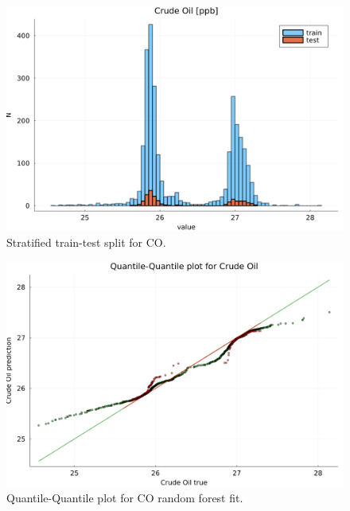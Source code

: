 \documentclass[remotesensing,article,submit,pdftex,moreauthors]{Definitions/mdpi}
\begin{document}
\begin{figure}[H]
\includegraphics[width=10.5 cm]{images/CO/CO_train-test_hist.png}
\caption{Stratified train-test split for CO.\label{CO_trainTestHist}}
\end{figure}

\begin{figure}[H]
\includegraphics[width=10.5 cm]{images/CO/rfr_CO_qq.png}
\caption{Quantile-Quantile plot for CO random forest fit. \label{CO_trainTestHist}}
\end{figure}
\end{document}
